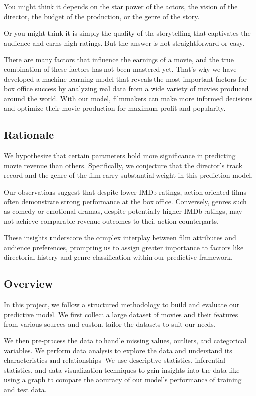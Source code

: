 \documentclass[conference]{IEEEtran}
\begin{document}
        You might think it depends on the star power of the actors, the vision of the director, the budget of the production, or the genre of the story.

        Or you might think it is simply the quality of the storytelling that captivates the audience and earns high ratings.
        But the answer is not straightforward or easy.

        There are many factors that influence the earnings of a movie, and the true combination of these factors has not been mastered yet.
        That’s why we have developed a machine learning model that reveals the most important factors for box office success by analyzing real data from a wide variety of movies produced around the world.
        With our model, filmmakers can make more informed decisions and optimize their movie production for maximum profit and popularity.

    \subsection{Rationale}
        We hypothesize that certain parameters hold more significance in predicting movie revenue than others. Specifically, we conjecture that the director's track record and the genre of the film carry substantial weight in this prediction model.

        Our observations suggest that despite lower IMDb ratings, action-oriented films often demonstrate strong performance at the box office. Conversely, genres such as comedy or emotional dramas, despite potentially higher IMDb ratings, may not achieve comparable revenue outcomes to their action counterparts.

        These insights underscore the complex interplay between film attributes and audience preferences, prompting us to assign greater importance to factors like directorial history and genre classification within our predictive framework.

    \subsection{Overview}
        In this project, we follow a structured methodology to build and evaluate our predictive model. We first collect a large dataset of movies and their features from various sources and custom tailor the datasets to suit our needs.

        We then pre-process the data to handle missing values, outliers, and categorical variables. We perform data analysis to explore the data and understand its characteristics and relationships. We use descriptive statistics, inferential statistics, and data visualization techniques to gain insights into the data like using a graph to compare the accuracy of our model's performance of training and test data.
\end{document}

